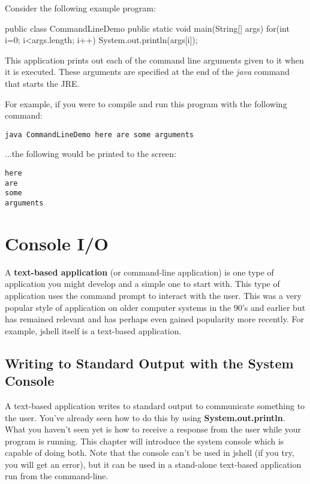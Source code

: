 Consider the following example program:

\begin{code}
public class CommandLineDemo {
  public static void main(String[] args) {
    for(int i=0; i<args.length; i++) {
      System.out.println(args[i]);
    }
  }
}
\end{code}

This application prints out each of the command line arguments given to it when it is executed. These arguments are specified at the end of the \textit{java} command that starts the JRE. 

For example, if you were to compile and run this program with the following command:

\begin{verbatim}
java CommandLineDemo here are some arguments
\end{verbatim}

...the following would be printed to the screen:

\begin{verbatim}
here
are
some
arguments
\end{verbatim}



\section{Console I/O}

A \textbf{text-based application} (or command-line application) is one type of application you might develop and a simple one to start with. This type of application uses the command prompt to interact with the user. This was a very popular style of application on older computer systems in the 90's and earlier but has remained relevant and has perhaps even gained popularity more recently. For example, jshell itself is a text-based application.

\subsection{Writing to Standard Output with the System Console}

A text-based application writes to standard output to communicate something to the user. You've already seen how to do this by using \textbf{System.out.println}. What you haven't seen yet is how to receive a response from the user while your program is running. This chapter will introduce the system console which is capable of doing both. Note that the console can't be used in jshell (if you try, you will get an error), but it can be used in a stand-alone text-based application run from the command-line. 

